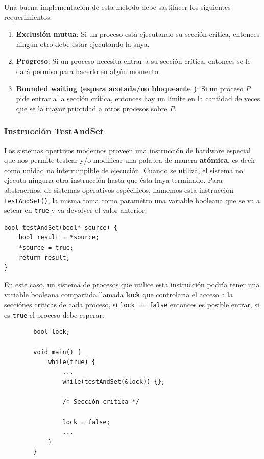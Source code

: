 Una buena implementación de esta método debe sastifacer los siguientes requerimientos:
\begin{enumerate}
	\item \textbf{Exclusión mutua}: Si un proceso está ejecutando su sección crítica,
	 entonces ningún otro debe estar ejecutando la suya.
 	\item \textbf{Progreso}: Si un proceso necesita entrar a su sección crítica, entonces se le dará permiso para hacerlo en algún momento.
	\item \textbf{Bounded waiting (espera acotada/no bloqueante	)}: Si un proceso $P$ pide entrar a la sección crítica, entonces hay un límite en la cantidad de veces que se la mayor prioridad a otros procesos sobre $P$.
\end{enumerate}
\subsubsection{Instrucción TestAndSet}
Los sistemas opertivos modernos proveen una instrucción de hardware especial que nos permite testear y/o modificar una palabra de manera \textbf{atómica}, es decir como unidad no interrumpible de ejecución. Cuando se utiliza, el sistema no ejecuta ninguna otra instrucción hasta que ésta haya terminado. Para abstraernos, de sistemas operativos espécificos, llamemos esta instrucción \texttt{testAndSet()}, la misma toma como paramétro una variable booleana que se va a setear en \texttt{true} y va devolver el valor anterior:

\begin{center}
	\begin{minipage}{0.5\textwidth}
		\begin{verbatim}
bool testAndSet(bool* source) {
	bool result = *source;
	*source = true;
	return result;
}
		\end{verbatim}
	\end{minipage}
\end{center}

En este caso, un sistema de procesos que utilice esta instrucción podría tener una variable booleana compartida llamada \textbf{lock} que controlaria el acceso a la secciónes criticas de cada proceso, si \texttt{lock == false} entonces es posible entrar, si es \texttt{true} el proceso debe esperar:

\begin{verbatim}
		bool lock;
		
		void main() {
			while(true) {
				...
				while(testAndSet(&lock)) {};
		
				/* Sección crítica */
		
				lock = false;
				...
			}	
		}
\end{verbatim}

